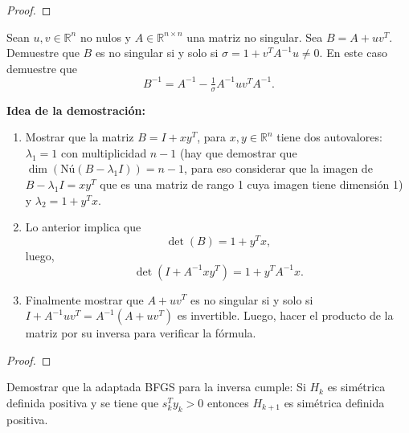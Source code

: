 \documentclass{article}
\newenvironment{theorem}[2][Ejercicio]{\begin{trivlist}
\item[\hskip \labelsep {\bfseries #1}\hskip \labelsep {\bfseries #2.}]}{\end{trivlist}}
\begin{document}
\begin{proof}

\end{proof}
\vspace{0.25in}

\begin{theorem}{7}
    Sean \(u, v \in \mathbb{R}^n\) no nulos y \(A \in \mathbb{R}^{n \times n}\) una matriz no singular.
    Sea \( B = A + u v^T \). Demuestre que \(B\) es no singular si y solo si
    \(\sigma = 1 + v^T A^{-1} u \neq 0\). En este caso demuestre que
    \[
        B^{-1} = A^{-1} - \tfrac{1}{\sigma} A^{-1} u v^T A^{-1}.
    \]

    \textbf{Idea de la demostración:}
    \begin{enumerate}
        \item[(a)] Mostrar que la matriz \(B = I + xy^T\), para \(x,y \in \mathbb{R}^n\)
              tiene dos autovalores: \(\lambda_1 = 1\) con multiplicidad \(n-1\)
              (hay que demostrar que \(\dim(\text{Nú}(B - \lambda_1 I)) = n-1\),
              para eso considerar que la imagen de \(B - \lambda_1 I = xy^T\) que es una matriz de rango 1
              cuya imagen tiene dimensión 1) y \(\lambda_2 = 1 + y^T x\).

        \item[(b)] Lo anterior implica que
              \[
                  \det(B) = 1 + y^T x,
              \]
              luego,
              \[
                  \det(I + A^{-1} x y^T) = 1 + y^T A^{-1} x.
              \]

        \item[(c)] Finalmente mostrar que \(A + uv^T\) es no singular si y solo si
              \(I + A^{-1} u v^T = A^{-1} (A + uv^T)\) es invertible.
              Luego, hacer el producto de la matriz por su inversa para verificar la fórmula.
    \end{enumerate}
\end{theorem}

\begin{proof}

\end{proof}
\vspace{0.25in}

\begin{theorem}{8}
    Demostrar que la adaptada BFGS para la inversa cumple:
    Si \(H_k\) es simétrica definida positiva y se tiene que \(s_k^T y_k > 0\)
    entonces \(H_{k+1}\) es simétrica definida positiva.
\end{theorem}
\end{document}
